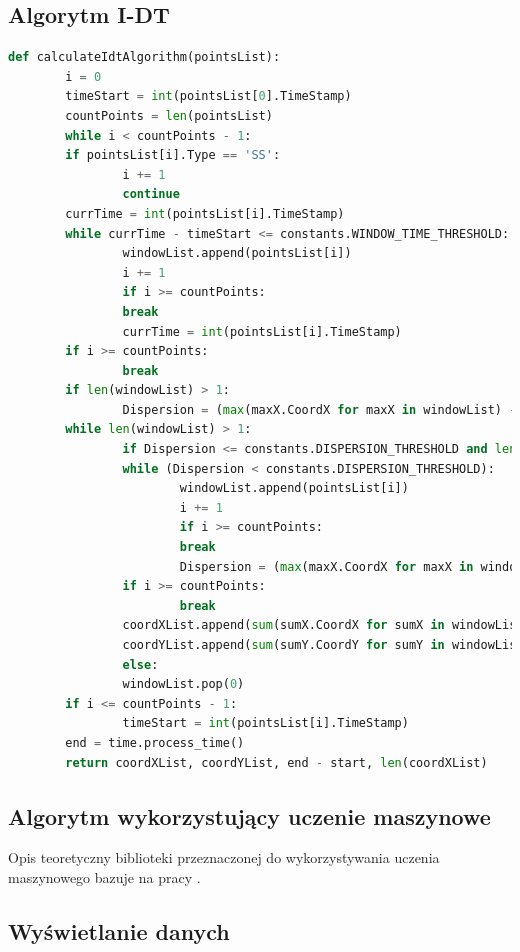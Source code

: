 \subsection{Algorytm I-DT}
\label{ssec:implementidt}
\begin{lstlisting}[language=Python, caption=Kod algorytmu I-DT, label={lst:idt}]
def calculateIdtAlgorithm(pointsList):
        i = 0
        timeStart = int(pointsList[0].TimeStamp)
        countPoints = len(pointsList)
        while i < countPoints - 1:
        if pointsList[i].Type == 'SS':
                i += 1
                continue
        currTime = int(pointsList[i].TimeStamp)
        while currTime - timeStart <= constants.WINDOW_TIME_THRESHOLD:
                windowList.append(pointsList[i])
                i += 1
                if i >= countPoints:
                break
                currTime = int(pointsList[i].TimeStamp)
        if i >= countPoints:
                break
        if len(windowList) > 1:
                Dispersion = (max(maxX.CoordX for maxX in windowList) - min(minX.CoordX for minX in windowList)) + (max(maxY.CoordY for maxY in windowList) - min(minY.CoordY for minY in windowList))
        while len(windowList) > 1:
                if Dispersion <= constants.DISPERSION_THRESHOLD and len(windowList) > 1:
                while (Dispersion < constants.DISPERSION_THRESHOLD):
                        windowList.append(pointsList[i])
                        i += 1
                        if i >= countPoints:
                        break
                        Dispersion = (max(maxX.CoordX for maxX in windowList) - min(minX.CoordX for minX in windowList)) + (max(maxY.CoordY for maxY in windowList) - min(minY.CoordY for minY in windowList))
                if i >= countPoints:
                        break
                coordXList.append(sum(sumX.CoordX for sumX in windowList) / len(windowList))
                coordYList.append(sum(sumY.CoordY for sumY in windowList) / len(windowList))
                else:
                windowList.pop(0)
        if i <= countPoints - 1:
                timeStart = int(pointsList[i].TimeStamp)
        end = time.process_time()
        return coordXList, coordYList, end - start, len(coordXList)
\end{lstlisting}
\subsection{Algorytm wykorzystujący uczenie maszynowe}
\label{ssec:machinelearningalg}
Opis teoretyczny biblioteki przeznaczonej do wykorzystywania uczenia maszynowego bazuje na pracy \cite{MLPython}.\par
\subsection{Wyświetlanie danych}
\label{ssec:datashow}

